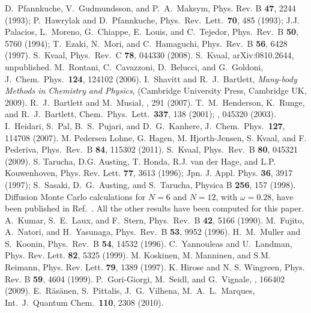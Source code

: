 \documentclass[twocolumn]{revtex4}
\begin{document}
\begin{thebibliography}{200}
D.~Pfannkuche, V.~Gudmundsson, and P.~A.~Maksym, Phys. Rev. B {\bf 47}, 2244 (1993);
P.~Hawrylak and D.~Pfannkuche, Phys.~Rev.~Lett.~{\bf 70}, 485 (1993); J.J. Palacios,
L.~Moreno, G.~Chiappe, E.~Louis, and C.~Tejedor, Phys.~Rev.~B {\bf 50}, 5760 (1994);
T.~Ezaki, N.~Mori, and C.~Hamaguchi, Phys.~Rev.~B {\bf 56}, 6428 (1997).
 S.~Kvaal, Phys.~Rev.~C {\bf 78}, 044330 (2008).
 S.~Kvaal, arXiv:0810.2644, unpublished.
 M.~Rontani, C.~Cavazzoni, 
D.~Belucci, and G.~Goldoni, J.~Chem.~Phys.~{\bf 124}, 124102 (2006).
 I.~Shavitt and R.\ J.\ Bartlett, {\em Many-body Methods in Chemistry and Physics},  
(Cambridge University Press, Cambridge UK, 2009). 
 R.\ J.\ Bartlett and M.\ Musia{\l}, , 291 (2007).
 T.~M.~Henderson, K.~Runge, and R.~J.~Bartlett, Chem.~Phys.~Lett.~{\bf 337}, 138 (2001); , 045320 (2003).
 I.~Heidari, S.~Pal, B.~S.~Pujari, and D.~G.~Kanhere, J.~Chem.~Phys.~{\bf 127}, 
114708 (2007).
 M. Pedersen Lohne, G. Hagen, M. Hjorth-Jensen, S. Kvaal, and F. Pederiva, Phys.~Rev.~B {\bf 84}, 115302 (2011).
 S.~Kvaal, Phys.~Rev.~B {\bf 80}, 045321 (2009).
 S. Tarucha, D.G. Austing, T. Honda, R.J. van der Hage, and L.P. Kouwenhoven,
Phys. Rev. Lett. {\bf 77}, 3613 (1996); Jpn. J. Appl. Phys. {\bf 36}, 3917 (1997);
S.~Sasaki, D.~G.~Austing, and S.~Tarucha, Physica B {\bf 256}, 157 (1998).
Diffusion Monte Carlo  
calculations for $N=6$ and $N=12$, with $\omega=0.28$,
have been published in Ref.~. All the other 
results have been computed for this paper.
 A.~Kumar, S.~E.~Laux, and F.~Stern, Phys.~Rev.~B {\bf 42}, 5166 (1990).
 M.~Fujito, A.~Natori, and H.~Yasunaga, Phys.~Rev.~B {\bf 53}, 9952 (1996).
 H.~M.~Muller and S.~Koonin, Phys.~Rev.~B {\bf 54}, 14532 (1996).
 C.~Yannouleas and U.~Landman, Phys. Rev. Lett. {\bf 82}, 5325 (1999).
 M. Koskinen, M. Manninen, and S.M. Reimann, Phys. Rev. Lett. {\bf 79}, 1389 (1997).
 K. Hirose and N. S. Wingreen, Phys. Rev. B {\bf 59}, 4604 (1999).
 P.~Gori-Giorgi, M.~Seidl, and G.~Vignale, , 166402 (2009).
 E.~R\"as\"anen, S.~Pittalis, J.~G.~Vilhena, M.~A.~L.~Marques, Int.~J.~Quantum Chem.~{\bf 110}, 2308 (2010). 
\end{thebibliography}
\end{document}
